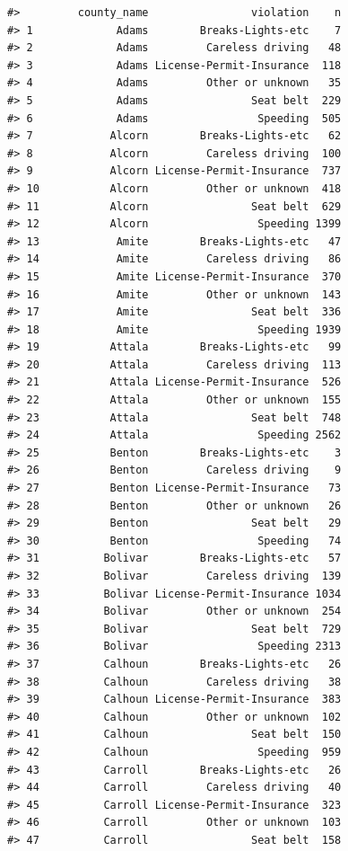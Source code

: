 \documentclass[
]{book}
\begin{document}
\begin{verbatim}
#>         county_name                violation    n
#> 1             Adams        Breaks-Lights-etc    7
#> 2             Adams         Careless driving   48
#> 3             Adams License-Permit-Insurance  118
#> 4             Adams         Other or unknown   35
#> 5             Adams                Seat belt  229
#> 6             Adams                 Speeding  505
#> 7            Alcorn        Breaks-Lights-etc   62
#> 8            Alcorn         Careless driving  100
#> 9            Alcorn License-Permit-Insurance  737
#> 10           Alcorn         Other or unknown  418
#> 11           Alcorn                Seat belt  629
#> 12           Alcorn                 Speeding 1399
#> 13            Amite        Breaks-Lights-etc   47
#> 14            Amite         Careless driving   86
#> 15            Amite License-Permit-Insurance  370
#> 16            Amite         Other or unknown  143
#> 17            Amite                Seat belt  336
#> 18            Amite                 Speeding 1939
#> 19           Attala        Breaks-Lights-etc   99
#> 20           Attala         Careless driving  113
#> 21           Attala License-Permit-Insurance  526
#> 22           Attala         Other or unknown  155
#> 23           Attala                Seat belt  748
#> 24           Attala                 Speeding 2562
#> 25           Benton        Breaks-Lights-etc    3
#> 26           Benton         Careless driving    9
#> 27           Benton License-Permit-Insurance   73
#> 28           Benton         Other or unknown   26
#> 29           Benton                Seat belt   29
#> 30           Benton                 Speeding   74
#> 31          Bolivar        Breaks-Lights-etc   57
#> 32          Bolivar         Careless driving  139
#> 33          Bolivar License-Permit-Insurance 1034
#> 34          Bolivar         Other or unknown  254
#> 35          Bolivar                Seat belt  729
#> 36          Bolivar                 Speeding 2313
#> 37          Calhoun        Breaks-Lights-etc   26
#> 38          Calhoun         Careless driving   38
#> 39          Calhoun License-Permit-Insurance  383
#> 40          Calhoun         Other or unknown  102
#> 41          Calhoun                Seat belt  150
#> 42          Calhoun                 Speeding  959
#> 43          Carroll        Breaks-Lights-etc   26
#> 44          Carroll         Careless driving   40
#> 45          Carroll License-Permit-Insurance  323
#> 46          Carroll         Other or unknown  103
#> 47          Carroll                Seat belt  158

\end{verbatim}
\end{document}
